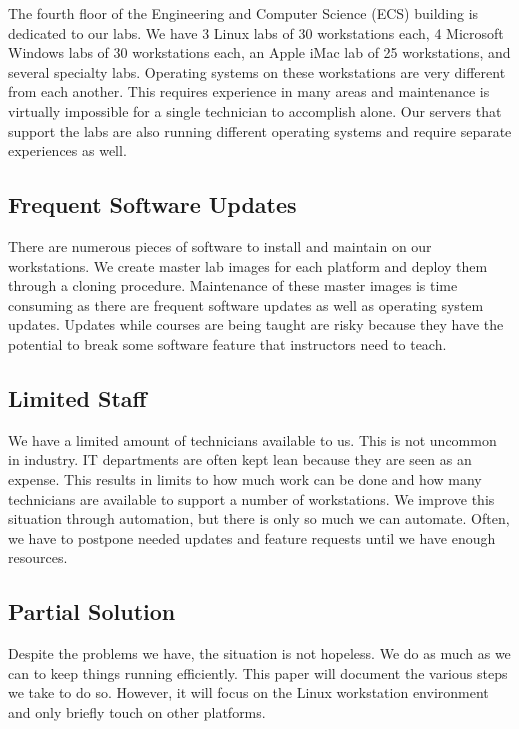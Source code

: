 The fourth floor of the Engineering and Computer Science (ECS) building is dedicated to our labs.  We have 3 Linux labs of 30 workstations each, 4 Microsoft Windows labs of 30 workstations each, an Apple iMac lab of 25 workstations, and several specialty labs.  Operating systems on these workstations are very different from each another.  This requires experience in many areas and maintenance is virtually impossible for a single technician to accomplish alone.  Our servers that support the labs are also running different operating systems and require separate experiences as well. 

\subsection{Frequent Software Updates}

There are numerous pieces of software to install and maintain on our workstations.  We create master lab images for each platform and deploy them through a cloning procedure.  Maintenance of these master images is time consuming as there are frequent software updates as well as operating system updates.  Updates while courses are being taught are risky because they have the potential to break some software feature that instructors need to teach. 

\subsection{Limited Staff}

We have a limited amount of technicians available to us.  This is not uncommon in industry.  IT departments are often kept lean because they are seen as an expense.  This results in limits to how much work can be done and how many technicians are available to support a number of workstations.  We improve this situation through automation, but there is only so much we can automate.  Often, we have to postpone needed updates and feature requests until we have enough resources.

\subsection{Partial Solution}
Despite the problems we have, the situation is not hopeless.  We do as much as we can to keep things running efficiently.  This paper will document the various steps we take to do so.  However, it will focus on the Linux workstation environment and only briefly touch on other platforms.  


